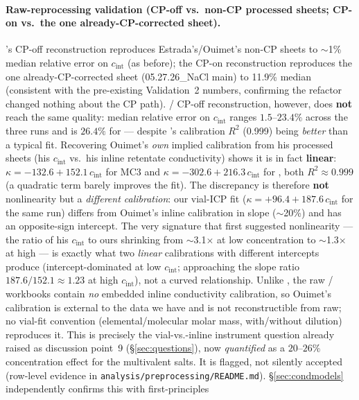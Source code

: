 \documentclass[11pt]{article}
\newcommand{\cint}{c_{\mathrm{int}}}
\begin{document}
\paragraph{Raw-reprocessing validation (CP-off vs.\ non-CP processed sheets;
CP-on vs.\ the one already-CP-corrected sheet).} 's CP-off
reconstruction reproduces Estrada's/Ouimet's non-CP sheets to $\sim$1\% median
relative error on $\cint$ (as before); the CP-on reconstruction reproduces
the one already-CP-corrected  sheet (05.27.26\_NaCl main) to 11.9\%
median (consistent with the pre-existing Validation~2 numbers, confirming the
refactor changed nothing about the  CP path). /
CP-off reconstruction, however, does \textbf{not} reach the same quality:
median relative error on $\cint$ ranges $1.5$--$23.4\%$ across the three
 runs and is $26.4\%$ for  --- despite 's
calibration $R^2$ (0.999) being \emph{better} than a typical  fit.
Recovering Ouimet's \emph{own} implied calibration from his processed
sheets (his $\cint$ vs.\ his inline retentate conductivity) shows it is in
fact \textbf{linear}: $\kappa=-132.6+152.1\,\cint$ for  MC3 and
$\kappa=-302.6+216.3\,\cint$ for , both $R^2\approx0.999$ (a
quadratic term barely improves the fit). The discrepancy is therefore
\textbf{not} nonlinearity but a \emph{different calibration}: our vial-ICP fit
($\kappa=+96.4+187.6\,\cint$ for the same  run) differs from
Ouimet's inline calibration in slope ($\sim$20\%) and has an opposite-sign
intercept. The very signature that first suggested nonlinearity --- the
ratio of his $\cint$ to ours shrinking from $\sim$3.1$\times$ at low
concentration to $\sim$1.3$\times$ at high --- is exactly what two
\emph{linear} calibrations with different intercepts produce
(intercept-dominated at low $\cint$; approaching the slope ratio
$187.6/152.1\approx1.23$ at high $\cint$), not a curved relationship. Unlike
, the raw / workbooks contain \emph{no} embedded
inline conductivity calibration, so Ouimet's calibration is external to
the data we have and is not reconstructible from raw; no vial-fit convention
(elemental/molecular molar mass, with/without dilution) reproduces it. This is
precisely the vial-vs.-inline instrument question already raised as discussion
point~9 (\S\ref{sec:questions}), now \emph{quantified} as a $20$--$26\%$
concentration effect for the multivalent salts. It is flagged, not silently
accepted (row-level evidence in \texttt{analysis/preprocessing/README.md}).
\S\ref{sec:condmodels} independently confirms this with first-principles
\end{document}
